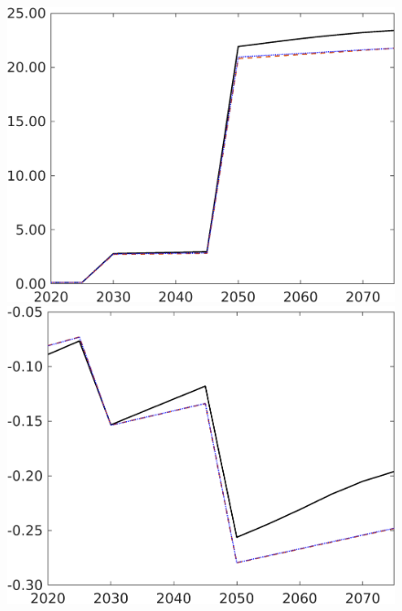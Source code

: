 \begin{figure}[h!!]
\begin{minipage}[]{0.32\textwidth}
	\end{minipage}
	\begin{minipage}[]{0.32\textwidth}
		\includegraphics[width=1\textwidth]{../../codding_model/own_basedOnFried/optimalPol_190722_tidiedUp/figures/all_July22/GFF_DDCompEffOPT_T_NoTaus_pol4_spillover0_noskill1_sep1_xgrowth0_etaa0.79_lgd0_lff0.png}
	\end{minipage}
	\begin{minipage}[]{0.32\textwidth}
		\includegraphics[width=1\textwidth]{../../codding_model/own_basedOnFried/optimalPol_190722_tidiedUp/figures/all_July22/SWF_DDCompEffOPT_T_NoTaus_pol4_spillover0_noskill1_sep1_xgrowth0_etaa0.79_lgd0_lff0.png}

\end{minipage}
\end{figure}
